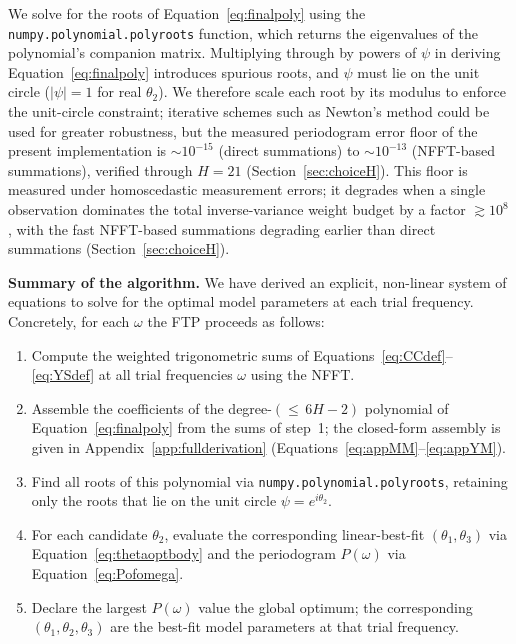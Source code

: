 \documentclass[apj]{emulateapj}
\newcommand{\eith}{\psi}
\begin{document}
We solve for the roots of Equation~\ref{eq:finalpoly} using the
\texttt{numpy.polynomial.polyroots} function, which returns the
eigenvalues of the polynomial's companion matrix.  Multiplying through
by powers of $\eith$ in deriving Equation~\ref{eq:finalpoly}
introduces spurious roots, and $\eith$ must lie on the unit circle
($|\eith|=1$ for real $\theta_2$).  We therefore scale each root by
its modulus to enforce the unit-circle constraint; iterative schemes
such as Newton's method could be used for greater robustness, but the
measured periodogram error floor of the present implementation is
$\sim 10^{-15}$ (direct summations) to $\sim 10^{-13}$ (NFFT-based
summations), verified through $H = 21$
(Section~\ref{sec:choiceH}).  This floor is measured under
homoscedastic measurement errors; it degrades when a single
observation dominates the total inverse-variance weight budget by a
factor $\gtrsim 10^8$, with the fast NFFT-based summations degrading
earlier than direct summations (Section~\ref{sec:choiceH}).

\medskip\noindent\textbf{Summary of the algorithm.}
We have derived an explicit, non-linear system of equations to solve
for the optimal model parameters at each trial frequency.  Concretely,
for each $\omega$ the FTP proceeds as follows:
\begin{enumerate}
\item Compute the weighted trigonometric sums of
      Equations~\ref{eq:CCdef}--\ref{eq:YSdef} at all trial
      frequencies $\omega$ using the NFFT.
\item Assemble the coefficients of the degree-$({\le}\,6H{-}2)$ polynomial
      of Equation~\ref{eq:finalpoly} from the sums of step~1; the
      closed-form assembly is given in
      Appendix~\ref{app:fullderivation}
      (Equations~\ref{eq:appMM}--\ref{eq:appYM}).
\item Find all roots of this polynomial via
      \texttt{numpy.polynomial.polyroots}, retaining only the roots
      that lie on the unit circle $\eith = e^{i\theta_2}$.
\item For each candidate $\theta_2$, evaluate the corresponding
      linear-best-fit $(\theta_1, \theta_3)$ via
      Equation~\ref{eq:thetaoptbody} and the periodogram $P(\omega)$
      via Equation~\ref{eq:Pofomega}.
\item Declare the largest $P(\omega)$ value the global optimum; the
      corresponding $(\theta_1, \theta_2, \theta_3)$ are the best-fit
      model parameters at that trial frequency.
\end{enumerate}
\end{document}
